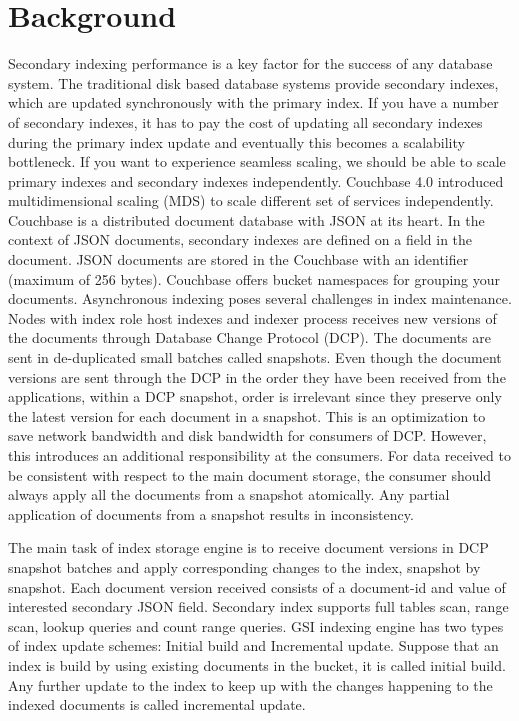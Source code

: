 \documentclass{vldb}
\begin{document}
\section{Background}
Secondary indexing performance is a key factor for the success of any database system.  The traditional disk based database systems provide secondary indexes, which are updated synchronously with the primary index. If you have a number of secondary indexes, it has to pay the cost of updating all secondary indexes during the primary index update and eventually this becomes a scalability bottleneck. If you want to experience seamless scaling, we should be able to scale primary indexes and secondary indexes independently. Couchbase 4.0 introduced multidimensional scaling (MDS) to scale different set of services independently. Couchbase is a distributed document database with JSON at its heart. In the context of JSON documents, secondary indexes are defined on a field in the document. JSON documents are stored in the Couchbase with an identifier (maximum of 256 bytes). Couchbase offers bucket namespaces for grouping your documents. Asynchronous indexing poses several challenges in index maintenance. Nodes with index role host indexes and indexer process receives new versions of the documents through Database Change Protocol (DCP). The documents are sent in de-duplicated small batches called snapshots. Even though the document versions are sent through the DCP in the order they have been received from the applications, within a DCP snapshot, order is irrelevant since they preserve only the latest version for each document in a snapshot. This is an optimization to save network bandwidth and disk bandwidth for consumers of DCP. However, this introduces an additional responsibility at the consumers. For data received to be consistent with respect to the main document storage, the consumer should always apply all the documents from a snapshot atomically. Any partial application of documents from a snapshot results in inconsistency.

    The main task of index storage engine is to receive document versions in DCP snapshot batches and apply corresponding changes to the index, snapshot by snapshot. Each document version received consists of a document-id and value of interested secondary JSON field. Secondary index supports full tables scan, range scan, lookup queries and count range queries. GSI indexing engine has two types of index update schemes: Initial build and Incremental update. Suppose that an index is build by using existing documents in the bucket, it is called initial build. Any further update to the index to keep up with the changes happening to the indexed documents is called incremental update.
\end{document}
